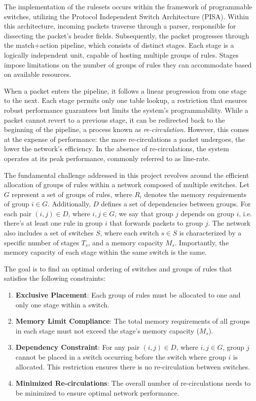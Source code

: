 The implementation of the rulesets occurs within the framework of programmable switches, utilizing the Protocol Independent Switch Architecture (PISA). Within this architecture, incoming packets traverse through a parser, responsible for dissecting the packet's header fields. Subsequently, the packet progresses through the match+action pipeline, which consists of distinct stages. Each stage is a logically independent unit, capable of hosting multiple groups of rules. Stages impose limitations on the number of groups of rules they can accommodate based on available resources.

When a packet enters the pipeline, it follows a linear progression from one stage to the next. Each stage permits only one table lookup, a restriction that ensures robust performance guarantees but limits the system's programmability. While a packet cannot revert to a previous stage, it can be redirected back to the beginning of the pipeline, a process known as \textit{re-circulation}. However, this comes at the expense of performance: the more re-circulations a packet undergoes, the lower the network's efficiency. In the absence of re-circulations, the system operates at its peak performance, commonly referred to as line-rate.

The fundamental challenge addressed in this project revolves around the efficient allocation of groups of rules within a network composed of multiple switches. Let \(G\) represent a set of groups of rules, where \(R_i\) denotes the memory requirements of group \(i \in G\). Additionally, \(D\) defines a set of dependencies between groups. For each pair \((i, j) \in D\), where \(i, j \in G\), we say that group \(j\) depends on group \(i\), i.e. there's at least one rule in group \(i\) that forwards packets to group \(j\). The network also includes a set of switches \(S\), where each switch \(s \in S\) is characterized by a specific number of stages \(T_s\), and a memory capacity \(M_s\). Importantly, the memory capacity of each stage within the same switch is the same.

The goal is to find an optimal ordering of switches and groups of rules that satisfies the following constraints:

\begin{enumerate}
    \item \textbf{Exclusive Placement}: Each group of rules must be allocated to one and only one stage within a switch.
    
    \item \textbf{Memory Limit Compliance}: The total memory requirements of all groups in each stage must not exceed the stage's memory capacity (\(M_s\)).
    
    \item \textbf{Dependency Constraint}: For any pair \((i, j) \in D\), where \(i, j \in G\), group \(j\) cannot be placed in a switch occurring before the switch where group \(i\) is allocated. This restriction ensures there is no re-circulation between switches.
    
    \item \textbf{Minimized Re-circulations}: The overall number of re-circulations needs to be minimized to ensure optimal network performance.
\end{enumerate}